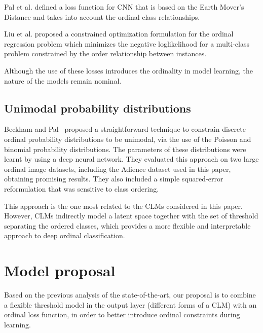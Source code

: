 \documentclass[preprint]{elsarticle}
\begin{document}
Pal et al. \cite{pal2018severity} defined a loss function for CNN that is based on the Earth Mover's Distance and takes into account the ordinal class relationships.

Liu et al. \cite{liu2018constrained} proposed a constrained optimization formulation for the ordinal regression problem which minimizes the negative loglikelihood for a multi-class problem constrained by the order relationship between instances.	

Although the use of these losses introduces the ordinality in model learning, the nature of the models remain nominal.


\subsection{Unimodal probability distributions}

Beckham and Pal~\cite{beckham2017unimodal} proposed a straightforward technique to constrain discrete ordinal probability distributions to be unimodal, via the use of the Poisson and binomial probability distributions. The parameters of these distributions were learnt by using a deep neural network. They evaluated this approach on two large ordinal image datasets, including the Adience dataset used in this paper, obtaining promising results. They also included a simple squared-error reformulation \cite{beckham2016simple} that was sensitive to class ordering.

This approach is the one most related to the CLMs considered in this paper. However, CLMs indirectly model a latent space together with the set of threshold separating the ordered classes, which provides a more flexible and interpretable approach to deep ordinal classification.	

\section{Model proposal}
\label{sect:modelProposal}

Based on the previous analysis of the state-of-the-art, our proposal is to combine a flexible threshold model in the output layer (different forms of a CLM) with an ordinal loss function, in order to better introduce ordinal constraints during learning.
\end{document}
